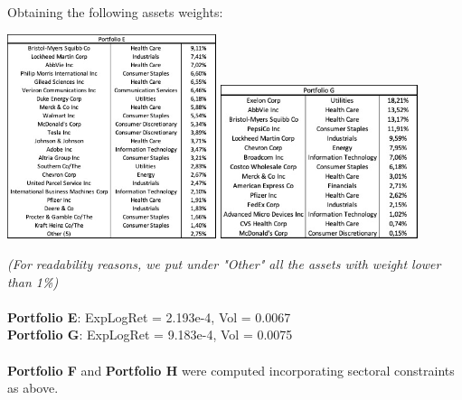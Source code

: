 \documentclass{assignment}
\begin{document}
Obtaining the following assets weights: 
\begin{center}
    \includegraphics[height=6cm]
    {assets/Port_E.jpg}
    \quad
    \includegraphics[height=4.5cm]
    {assets/Port_G.jpg}
\end{center}
\textit{(For readability reasons, we put under "Other" all the assets with weight lower than 1\%)}
\\\\
\textbf{Portfolio E}: ExpLogRet = 2.193e-4, Vol = 0.0067 \\
\textbf{Portfolio G}: ExpLogRet = 9.183e-4, Vol = 0.0075\\\\
\textbf{Portfolio F} and \textbf{Portfolio H} were computed incorporating sectoral constraints as
above. 
\end{document}
